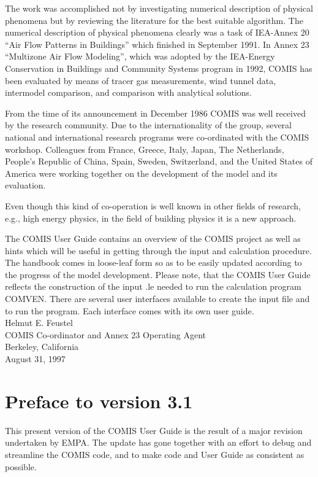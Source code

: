 \documentclass[10pt]{book}
\begin{document}
The work was accomplished not by investigating numerical description of physical phenomena but by reviewing the literature for the best suitable algorithm. The numerical description of physical phenomena clearly was a task of IEA-Annex 20 ``Air Flow Patterns in Buildings'' which finished in September 1991. In Annex 23 ``Multizone Air Flow Modeling'', which was adopted by the IEA-Energy Conservation in Buildings and Community Systems program in 1992, COMIS has been evaluated by means of tracer gas measurements, wind tunnel data, intermodel comparison, and comparison with analytical solutions. 

From the time of its announcement in December 1986 COMIS was well received by the research community. Due to the internationality of the group, several national and international research programs were co-ordinated with the COMIS workshop. Colleagues from France, Greece, Italy, Japan, The Netherlands, People's Republic of China, Spain, Sweden, Switzerland, and the United States of America were working together on the development of the model and its evaluation. 

Even though this kind of co-operation is well known in other fields of research, e.g., high energy physics, in the field of building physics it is a new approach. 

The COMIS User Guide contains an overview of the COMIS project as well as hints which will be useful in getting through the input and calculation procedure. The handbook comes in loose-leaf form so as to be easily updated according to the progress of the model development. Please note, that the COMIS User Guide reflects the construction of the input .le needed to run the calculation program COMVEN. There are several user interfaces available to create the input file and to run the program. Each interface comes with its own user guide.
\\

Helmut E. Feustel\\
COMIS Co-ordinator and Annex 23 Operating Agent\\ 
Berkeley, California\\
August 31, 1997\\

\section*{Preface to version 3.1} 
This present version of the COMIS User Guide is the result of a major revision undertaken by EMPA. The update has gone together with an effort to debug and streamline the COMIS code, and to make code and User Guide as consistent as possible. 
\end{document}
